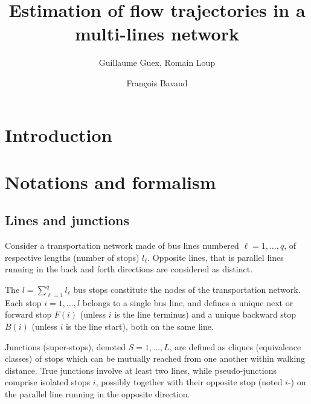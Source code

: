 \documentclass{llncs}
\begin{document}
\title{Estimation of flow trajectories in a multi-lines network}
%
%
\author{Guillaume Guex, Romain Loup \and
	François Bavaud}
%
%
%

\maketitle    

\section{Introduction}

\section{Notations and formalism}
\subsection{Lines and junctions}
\label{Lines and junctions}
Consider a transportation network made of bus lines numbered $\ell=1,\ldots, q$, of respective lengths (number of stops) $l_\ell$.  Opposite lines, that is parallel lines running in the back and forth directions are considered as distinct. 

The $l=\sum_{\ell=1}^ql_\ell$ bus stops constitute the nodes of the transportation network. Each stop $i=1,\ldots,l$ belongs to a single bus line, and defines a unique next or forward stop $F(i)$ (unless $i$ is the line terminus) and a unique backward stop $B(i)$ (unless $i$ is the line start), both on the same line.  

Junctions (super-stops), denoted $S=1,\ldots, L$, are defined as cliques (equivalence classes) of stops which can be mutually reached from one another within walking distance. True junctions 
involve at least two lines, while pseudo-junctions comprise isolated stops $i$, possibly together with their opposite stop (noted $i\text{-}$) on the parallel line running in the opposite direction. 
\end{document}
